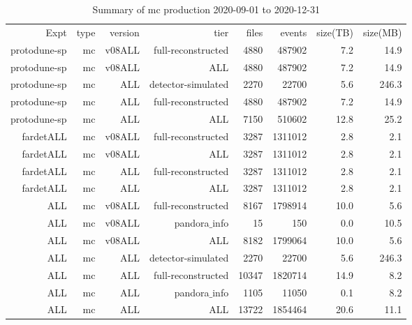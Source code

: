 \documentclass[10pt]{article}
\begin{document}
\begin{table}
\begin{tabular}{rrrrrrrr}
Expt&type&version&tier&files&events&size(TB)&size(MB)\\
protodune-sp & mc & v08ALL& full-reconstructed &4880 &487902 &       7.2&      14.9\\
protodune-sp & mc & v08ALL& ALL &4880 &487902 &       7.2&      14.9\\
protodune-sp & mc & ALL& detector-simulated &2270 &22700 &       5.6&     246.3\\
protodune-sp & mc & ALL& full-reconstructed &4880 &487902 &       7.2&      14.9\\
protodune-sp & mc & ALL& ALL &7150 &510602 &      12.8&      25.2\\
fardetALL & mc & v08ALL& full-reconstructed &3287 &1311012 &       2.8&       2.1\\
fardetALL & mc & v08ALL& ALL &3287 &1311012 &       2.8&       2.1\\
fardetALL & mc & ALL& full-reconstructed &3287 &1311012 &       2.8&       2.1\\
fardetALL & mc & ALL& ALL &3287 &1311012 &       2.8&       2.1\\
ALL & mc & v08ALL& full-reconstructed &8167 &1798914 &      10.0&       5.6\\
ALL & mc & v08ALL& pandora$\_$info &15 &150 &       0.0&      10.5\\
ALL & mc & v08ALL& ALL &8182 &1799064 &      10.0&       5.6\\
ALL & mc & ALL& detector-simulated &2270 &22700 &       5.6&     246.3\\
ALL & mc & ALL& full-reconstructed &10347 &1820714 &      14.9&       8.2\\
ALL & mc & ALL& pandora$\_$info &1105 &11050 &       0.1&       8.2\\
ALL & mc & ALL& ALL &13722 &1854464 &      20.6&      11.1\\
\end{tabular}
\caption{Summary of mc production 2020-09-01 to 2020-12-31}
\end{table}
\end{document}
